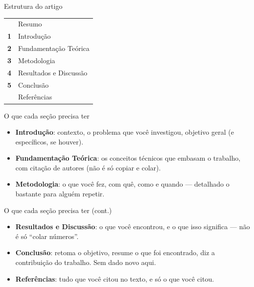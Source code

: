 \documentclass[12pt,aspectratio=169]{beamer}
\begin{document}
\begin{frame}{Estrutura do artigo}
  \begin{center}
    \begin{tabular}{c l}
      & Resumo \\
      \textbf{1} & Introdução \\
      \textbf{2} & Fundamentação Teórica \\
      \textbf{3} & Metodologia \\
      \textbf{4} & Resultados e Discussão \\
      \textbf{5} & Conclusão \\
      & Referências \\
    \end{tabular}
  \end{center}
\end{frame}

\begin{frame}{O que cada seção precisa ter}
  \begin{itemize}
    \item \textbf{Introdução}: contexto, o problema que você investigou,
          objetivo geral (e específicos, se houver).
    \item \textbf{Fundamentação Teórica}: os conceitos técnicos que
          embasam o trabalho, com citação de autores (não é só copiar e
          colar).
    \item \textbf{Metodologia}: o que você fez, com quê, como e quando ---
          detalhado o bastante para alguém repetir.
  \end{itemize}
\end{frame}

\begin{frame}{O que cada seção precisa ter (cont.)}
  \begin{itemize}
    \item \textbf{Resultados e Discussão}: o que você encontrou, e o que
          isso significa --- não é só ``colar números''.
    \item \textbf{Conclusão}: retoma o objetivo, resume o que foi
          encontrado, diz a contribuição do trabalho. Sem dado novo aqui.
    \item \textbf{Referências}: tudo que você citou no texto, e só o que
          você citou.
  \end{itemize}
\end{frame}
\end{document}
